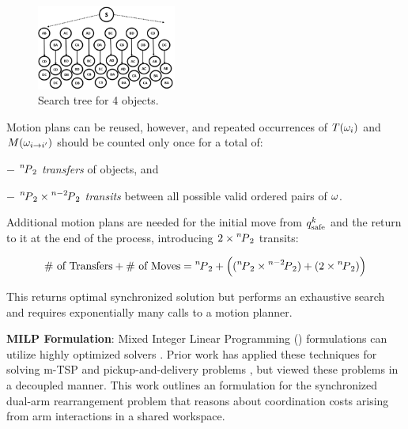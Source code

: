 \begin{figure}
    \vspace{-.5in}
	\centering
	\includegraphics[width=1.8in]{figures/dual_backtracking.PNG}
    \vspace{-.15in}
	\caption{Search tree for 4 objects. 
	}
	\label{fig:backtracking}
    \vspace{-.3in}
\end{figure}
Motion plans can be reused, however, and repeated occurrences of $T(\coma_i)$ and $M(\coma_{i\rightarrow i^{\prime}})$ should be counted only once for a total of: 
\begin{myitem}
\item[$-$] $  {\permu[n]{2}} $ \textit{transfers} of objects, and 
\item[$-$] $ {{\permu[n]{2}}\times\permu[n-2]{2}} $ \textit{transits} between all possible valid ordered pairs of $ \coma $.
\end{myitem}
Additional motion plans are needed for the initial move from $q_{\rm safe}^k$ and the return to it at the end of the process, introducing $ 2\times\permu[n]{2} $ transits:

\vspace{-0.35in}
\begin{equation}
\textrm{\# of Transfers} + \textrm{\# of Moves} =  {\permu[n]{2}} +   \Big{(}({{\permu[n]{2}}\times\permu[n-2]{2}}) + (2\times{\permu[n]{2}})\Big{)}
\label{eq:mpcount}
\vspace{-0.2in}
\end{equation}

This returns optimal synchronized solution but performs an exhaustive search and requires exponentially many calls to a motion planner.

\noindent\textbf{MILP Formulation}:
Mixed Integer Linear Programming (\milp) formulations can utilize highly optimized solvers \cite{gurobi}. Prior work has applied these techniques for solving m-TSP \cite{rathinam2006matroid,friggstad2013multiple} and pickup-and-delivery problems \cite{coltin2014multi,savelsbergh1995general}, but viewed these problems in a decoupled manner. This work outlines an \milp formulation for the synchronized dual-arm rearrangement problem that reasons about coordination costs arising from arm interactions in a shared workspace.

